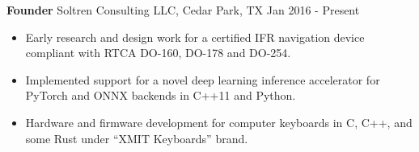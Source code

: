 \textbf{Founder}
Soltren Consulting LLC, Cedar Park, TX \hfill Jan 2016 - Present

\begin{itemize} \itemsep -2pt

\item Early research and design work for a certified IFR navigation device compliant with RTCA DO-160, DO-178 and DO-254.

\item Implemented support for a novel deep learning inference accelerator for PyTorch and ONNX backends in C++11
      and Python.

\item Hardware and firmware development for computer keyboards in C, C++, and some Rust under ``XMIT Keyboards'' brand.

\end{itemize}
